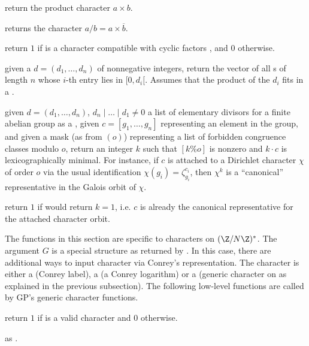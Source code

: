  return the product character $a\times
b$.

 returns the character
$a / b = a \times \overline{b}$.

 return $1$ if  is a character
compatible with cyclic factors , and $0$ otherwise.

 given a  $d = (d_1,\dots,d_n)$
of nonnegative integers, return the vector of all s of length
$n$ whose $i$-th entry lies in $[0,d_i[$. Assumes that the product
of the $d_i$ fits in a .

 given $d =
(d_1,\dots,d_n)$, $d_n \mid \dots \mid d_1 \neq 0$ a list of elementary
divisors for a finite abelian group as a , given $c =
[g_1,\dots,g_n]$ representing an element in the group, and given a mask
 (as from $(o)$) representing a list of
forbidden congruence classes modulo $o$, return an integer $k$ such that
$[k \% o]$ is nonzero and $k \cdot c$ is lexicographically
minimal. For instance, if $c$ is attached to a Dirichlet character $\chi$ of
order $o$ via the usual identification $\chi(g_i) = \zeta_{g_i}^{c_i}$, then
$\chi^k$ is a ``canonical'' representative in the Galois orbit of $\chi$.

 return $1$ if
 would return $k = 1$, i.e. $c$ is already the canonical
representative for the attached character orbit.


The functions in this section are  specific to characters on $(\Z/N\Z)^*$.
The argument $G$ is a special  structure as returned by
. In this case, there are additional ways
to input character via Conrey's representation. The character  is
either a  (Conrey label), a  (a Conrey logarithm) or a
 (generic character on  as explained in the previous
subsection). The following low-level functions are called by GP's generic
character functions.

 return $1$ if  is
a valid character and $0$ otherwise.

 as .

